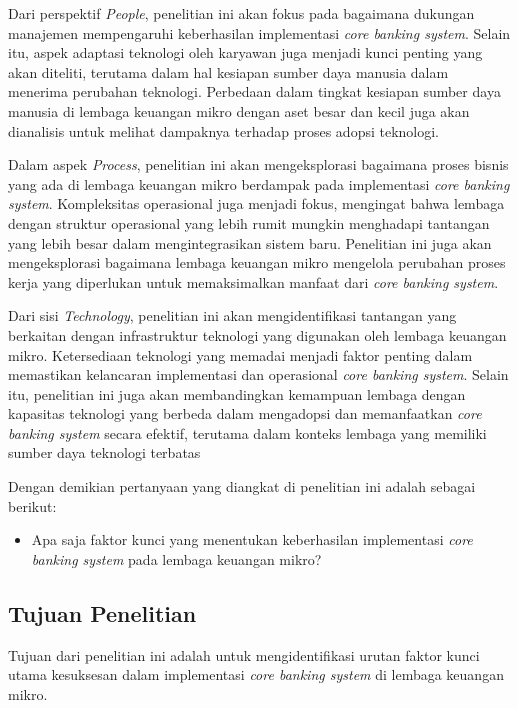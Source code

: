 \documentclass[journal,article,submit,pdftex,moreauthors]{Definitions/mdpi}
\begin{document}
Dari perspektif \textit{People}, penelitian ini akan fokus pada bagaimana dukungan manajemen mempengaruhi keberhasilan implementasi \textit{core banking system}. Selain itu, aspek adaptasi teknologi oleh karyawan juga menjadi kunci penting yang akan diteliti, terutama dalam hal kesiapan sumber daya manusia dalam menerima perubahan teknologi. Perbedaan dalam tingkat kesiapan sumber daya manusia di lembaga keuangan mikro dengan aset besar dan kecil juga akan dianalisis untuk melihat dampaknya terhadap proses adopsi teknologi.

Dalam aspek \textit{Process}, penelitian ini akan mengeksplorasi bagaimana proses bisnis yang ada di lembaga keuangan mikro berdampak pada implementasi \textit{core banking system}. Kompleksitas operasional juga menjadi fokus, mengingat bahwa lembaga dengan struktur operasional yang lebih rumit mungkin menghadapi tantangan yang lebih besar dalam mengintegrasikan sistem baru. Penelitian ini juga akan mengeksplorasi bagaimana lembaga keuangan mikro mengelola perubahan proses kerja yang diperlukan untuk memaksimalkan manfaat dari \textit{core banking system}.

Dari sisi \textit{Technology}, penelitian ini akan mengidentifikasi tantangan yang berkaitan dengan infrastruktur teknologi yang digunakan oleh lembaga keuangan mikro. Ketersediaan teknologi yang memadai menjadi faktor penting dalam memastikan kelancaran implementasi dan operasional \textit{core banking system}. Selain itu, penelitian ini juga akan membandingkan kemampuan lembaga dengan kapasitas teknologi yang berbeda dalam mengadopsi dan memanfaatkan \textit{core banking system} secara efektif, terutama dalam konteks lembaga yang memiliki sumber daya teknologi terbatas

Dengan demikian pertanyaan yang diangkat di penelitian ini adalah sebagai berikut:
\begin{itemize}
    \item Apa saja faktor kunci yang menentukan keberhasilan implementasi \textit{core banking system} pada lembaga keuangan mikro?
\end{itemize}

\subsection{Tujuan Penelitian}
Tujuan dari penelitian ini adalah untuk mengidentifikasi urutan faktor kunci utama kesuksesan dalam implementasi \textit{core banking system} di lembaga keuangan mikro.
\end{document}
